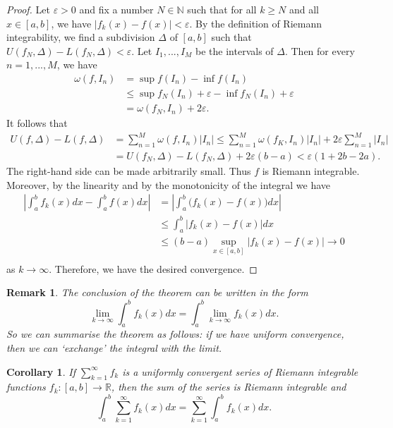 \documentclass[a4paper,reqno]{amsart}
\numberwithin{equation}{section}
\newtheorem{corollary}[definition]{Corollary}
\newtheorem{remark}[definition]{Remark}
\def\R{\mathbb{R}}
\begin{document}
\begin{proof}
Let $\varepsilon > 0$ and fix a number $N \in \mathbb{N}$ such that for all $k \geq N$ and all $x \in [a, b]$, we have $|f_k (x) - f (x)| < \varepsilon$. 
By the definition of Riemann integrability, we find a subdivision $\Delta$ of $[a,b]$ such that $U(f_N,\Delta) - L(f_N,\Delta) < \varepsilon$. Let $I_1,...,I_M$ be the intervals of 
$\Delta$. Then for every $n = 1,...,M$, we have
\begin{align*}
\omega(f, I_n) &= \sup f(I_n) - \inf f(I_n)\\
&\leq \sup f_N (I_n) + \varepsilon - \inf f_N (I_n) + \varepsilon\\
&= \omega(f_N , I_n) + 2\varepsilon.
\end{align*}
It follows that
\begin{align*}
U(f,\Delta) - L(f,\Delta) &= \sum_{n=1}^M \omega(f, I_n) |I_n| \leq \sum_{n=1}^M \omega(f_K, I_n) |I_n| + 2\varepsilon\sum_{n=1}^M |I_n| \\
& = U(f_N,\Delta) - L(f_N,\Delta) + 2\varepsilon (b-a) < \varepsilon (1+ 2b - 2a).
\end{align*}
The right-hand side can be made arbitrarily small. Thus $f$ is Riemann integrable.
Moreover, by the linearity and by the monotonicity of the integral we have
\begin{align*}
\left|\int_a^b f_k(x)dx - \int_a^b f(x)dx\right| &= \left|\int_a^b \Big(f_k(x) - f(x)\Big)dx \right|\\
&\leq \int_a^b \Big|f_k(x) - f(x)\Big|dx\\
&\leq(b-a) \sup_{x\in [a,b]} \Big|f_k(x) - f(x)\Big| \to 0\\
\end{align*}
as $k\to \infty$. Therefore, we have the desired convergence.
\end{proof}


\begin{remark}
The conclusion of the theorem can be written in the form
$$
\lim_{k\to \infty}\int_a^b f_k(x)dx = \int_a^b \lim_{k\to \infty} f_k(x)dx.
$$
So we can summarise the theorem as follows: if we have uniform convergence,
then we can `exchange' the integral with the limit.
\end{remark}

\begin{corollary}\label{series:i}
If $\sum_{k=1}^\infty f_k$ is a uniformly convergent series of Riemann integrable functions $f_k : [a, b] \to \R$, then the sum of the series is Riemann integrable and
$$
\int_a^b\sum_{k=1}^\infty f_k(x) dx = \sum_{k=1}^\infty \int_a^b f_k(x) dx.
$$
\end{corollary}
\end{document}
